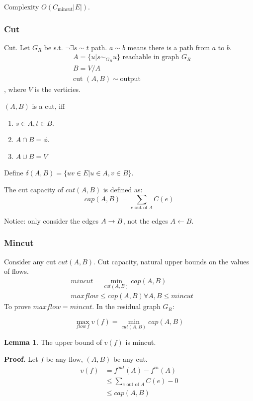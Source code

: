 \documentclass[a4paper]{report}
\theoremstyle{definition}
\newtheorem{lem}{Lemma}[section]
\begin{document}
Complexity $O(C_{\text{mincut}}|E|)$.
\subsubsection{Cut}
Cut. Let $G_R$ be s.t. $\neg \exists s \sim t$ path. $a \sim b$ means there is a path from $a$ to $b$. 
\begin{align*}
& A = \{u| s\sim_{G_R} u\} \text{ reachable in graph $G_R$}\\
& B = V/A\\
& \text{cut } (A, B) \sim \text{output}
\end{align*}
, where $V$ is the verticies.

$(A, B)$ is a cut, iff
\begin{enumerate}
\item $s\in A, t\in B$.
\item $A\cap B = \phi$.
\item $A\cup B = V$
\end{enumerate}
Define $\delta(A,B)=\{uv\in E| u\in A, v\in B\}$.

The cut capacity of $cut(A,B)$ is defined as:
$$
cap(A, B) = \sum_{e \text{ out of }A}C(e)
$$

Notice: only consider the edges $A\rightarrow B$, not the edges $A \leftarrow B$.

\subsubsection{Mincut}
Consider any cut $cut(A,B)$. Cut capacity, natural upper bounds on the values of flows.
\begin{align*}
& mincut = \min_{cut(A,B)} cap(A, B)\\
& maxflow \leq cap(A, B) \forall A, B \leq mincut
\end{align*}
To prove $maxflow = mincut$. In the residual graph $G_R$:

$$
\max_{flow~f} v(f) = \min_{cut(A, B)} cap(A,B)
$$

\begin{lem}
The upper bound of $v(f)$ is mincut.
\end{lem}

\textbf{Proof.} Let $f$ be any flow, $(A,B)$ be any cut.
\begin{align*}
v(f) &= f^{out}(A)-f^{in}(A) \\
&\leq \sum_{e \text{ out of }A}C(e) - 0\\
&\leq cap(A, B) \\
\end{align*}
\end{document}
